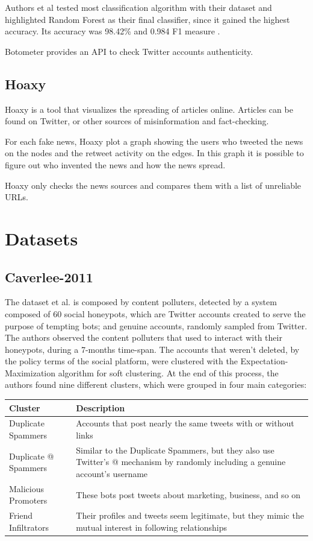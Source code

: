 Authors et al \cite{Botometer} tested most classification algorithm with their dataset and highlighted Random Forest as their final classifier, since it gained the highest accuracy. Its accuracy was 98.42\% and 0.984 F1 measure \cite{Lee11sevenmonths}.

Botometer provides an API to check Twitter accounts authenticity.

\subsection{Hoaxy}
Hoaxy is a tool that visualizes the spreading of articles online. Articles can be found on Twitter, or other sources of misinformation and fact-checking.

For each fake news, Hoaxy plot a graph showing the users who tweeted the news on the nodes and the retweet activity on the edges. In this graph it is possible to figure out who invented the news and how the news spread.

Hoaxy only checks the news sources and compares them with a list of unreliable URLs.

\section{Datasets}

\subsection{Caverlee-2011}
The dataset et al. \cite{Lee11sevenmonths} is composed by content polluters, detected by a system composed of 60 social honeypots, which are Twitter accounts created to serve the purpose of tempting bots; and genuine accounts, randomly sampled from Twitter.
The authors observed the content polluters that used to interact with their honeypots, during a 7-months time-span. The accounts that weren't deleted, by the policy terms of the social platform, were clustered with the Expectation-Maximization algorithm for soft clustering. At the end of this process, the authors found nine different clusters, which were grouped in four main categories:

\begin{center}
	\begin{tabular}{>{\raggedright\arraybackslash}m{5.5cm}|>{\raggedright\arraybackslash}m{5.5cm}}
		\\Cluster&Description\\
		\hline\hline
		Duplicate Spammers & Accounts that post nearly the same tweets with or without links\\\hline
		Duplicate @ Spammers & Similar to the Duplicate Spammers, but they also use Twitter’s @ mechanism by randomly including a genuine account’s username\\\hline
		Malicious Promoters & These bots post tweets about marketing, business, and so on\\\hline
		Friend Infiltrators & Their profiles and tweets seem legitimate, but they mimic the mutual interest in following relationships\\\hline
	\end{tabular}
\end{center}

